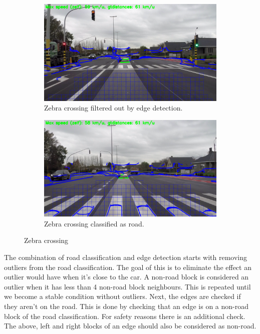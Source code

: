 \documentclass[runningheads,a4paper]{llncs}
\begin{document}
\begin{figure}[ht]
\centering
\begin{subfigure}{.5\textwidth}
  \centering
  \includegraphics[width=.9\textwidth]{fig/zebra_edge_filtered.png}
  \caption{Zebra crossing filtered out by edge detection.}
\end{subfigure}%
\begin{subfigure}{.5\textwidth}
  \centering
  \includegraphics[width=.9\textwidth]{fig/zebra_road_filtered.png}
  \caption{Zebra crossing classified as road.}
\end{subfigure}
\caption{Zebra crossing\label{zebra}}
\end{figure}

The combination of road classification and edge detection starts with removing outliers from the road classification. The goal of this is to eliminate the effect an outlier would have when it's close to the car. A non-road block is considered an outlier when it has less than 4 non-road block neighbours. This is repeated until we become a stable condition without outliers. 
Next, the edges are checked if they aren't on the road. This is done by checking that an edge is on a non-road block of the road classification. For safety reasons there is an additional check. The above, left and right blocks of an edge should also be considered as non-road. 
\end{document}
